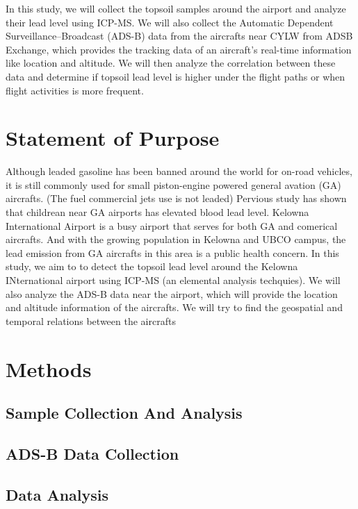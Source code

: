 \documentclass[12pt]{article}
\begin{document}
In this study, we will collect the topsoil samples around the airport and analyze their lead level using ICP-MS. We will also collect the Automatic Dependent Surveillance–Broadcast (ADS-B) data from the aircrafts near CYLW from ADSB Exchange\cite{adsbexchange}, which 
provides the tracking data of an aircraft's real-time information like location and altitude. We will then analyze the correlation between these data and determine if topsoil lead level is higher under the flight paths or when flight activities is more frequent. 
\section{Statement of Purpose}
Although leaded gasoline has been banned around the world for on-road vehicles, it is still commonly used for small piston-engine powered general avation (GA) aircrafts. (The fuel commercial jets use is not leaded) Pervious study has shown that childrean near GA airports has elevated blood lead level. Kelowna International Airport is a busy airport that serves for both GA and comerical aircrafts. And with the growing population in Kelowna and UBCO campus, the lead emission from GA aircrafts in this area is a public health concern. In this study, we aim to to detect the topsoil lead level around the Kelowna INternational airport using ICP-MS (an elemental analysis techquies). We will also analyze the ADS-B data near the airport, which will provide the location and altitude information of the aircrafts. We will try to find the geospatial and temporal relations between the aircrafts  
\section{Methods}
\subsection{Sample Collection And Analysis}
\subsection{ADS-B Data Collection}
\subsection{Data Analysis}
\newpage
\printbibliography
\end{document}
